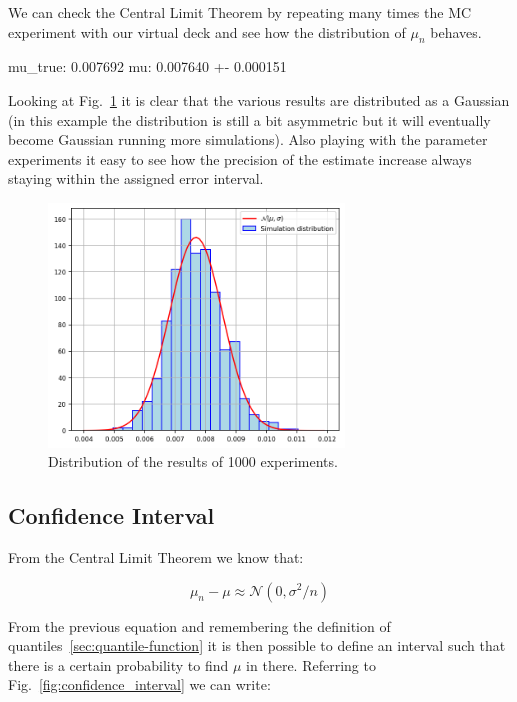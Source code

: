 We can check the Central Limit Theorem by repeating many times the MC experiment with our virtual deck and see how the distribution of $\mu_n$ behaves.

\begin{ioutput}
mu_true: 0.007692
mu: 0.007640 +- 0.000151
\end{ioutput}

Looking at Fig.~\ref{fig:repeated_MC} it is clear that the various results are distributed as a Gaussian (in this example the distribution is still a bit asymmetric but it will eventually become Gaussian running more simulations). Also playing with the parameter experiments it easy to see how the precision of the estimate increase always staying within the assigned error interval.

\begin{figure}[htb]
\centering
\includegraphics[width=0.7\textwidth]{figures/experiment_distribution}
\caption{Distribution of the results of 1000 experiments.}
\label{fig:repeated_MC}
\end{figure}

\subsection{Confidence Interval}

From the Central Limit Theorem we know that: 

\begin{equation}
\mu_n - \mu \approx \mathcal{N}(0, \sigma^2/n)
\end{equation}

From the previous equation and remembering the definition of quantiles~\ref{sec:quantile-function} it is then possible to define an interval such that there is a certain probability to find $\mu$ in there. Referring to Fig.~\ref{fig:confidence_interval} we can write:

